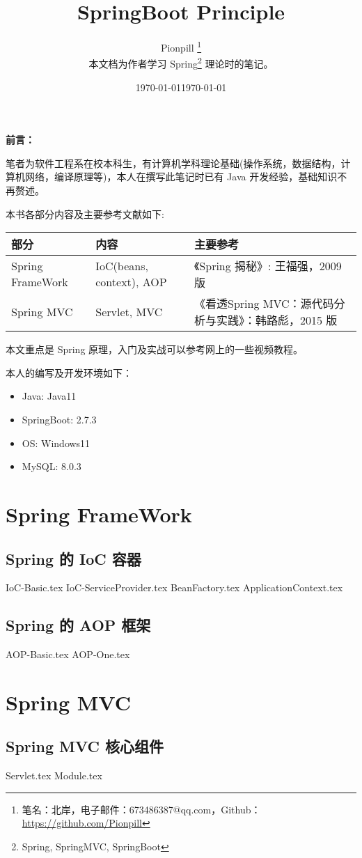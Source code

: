 \documentclass{PionpillNote-book}
\title{SpringBoot Principle}
\author{
    Pionpill \footnote{笔名：北岸，电子邮件：673486387@qq.com，Github：\url{https://github.com/Pionpill}} \\
    本文档为作者学习 Spring\footnote{Spring, SpringMVC, SpringBoot} 理论时的笔记。\\
}
\date{\today}
\begin{document}
\pagestyle{plain}
\maketitle

\noindent\textbf{前言：}

笔者为软件工程系在校本科生，有计算机学科理论基础(操作系统，数据结构，计算机网络，编译原理等)，本人在撰写此笔记时已有 Java 开发经验，基础知识不再赘述。

本书各部分内容及主要参考文献如下:
\begin{table}[H]
    \footnotesize
    \centering
    \setlength{\tabcolsep}{4mm}
    \begin{tabular}{l|l|l}
        \toprule
        \textbf{部分} & \textbf{内容} & \textbf{主要参考} \\
        \midrule
        Spring FrameWork & IoC(beans, context), AOP & 《Spring 揭秘》: 王福强，2009 版 \\
        Spring MVC & Servlet, MVC & 《看透Spring MVC：源代码分析与实践》：韩路彪，2015 版 \\
        \bottomrule
    \end{tabular}
\end{table}

本文重点是 Spring 原理，入门及实战可以参考网上的一些视频教程。

本人的编写及开发环境如下：
\begin{itemize}
    \item Java: Java11
    \item SpringBoot: 2.7.3
    \item OS: Windows11 
    \item MySQL: 8.0.3
\end{itemize}

\date{\today}
\newpage

\tableofcontents

\newpage

\setcounter{page}{1} 
\pagestyle{fancy}

\part{Spring FrameWork}
\chapter{Spring 的 IoC 容器}
{IoC-Basic.tex}
{IoC-ServiceProvider.tex}
{BeanFactory.tex}
{ApplicationContext.tex}
\chapter{Spring 的 AOP 框架}
{AOP-Basic.tex}
{AOP-One.tex}

\part{Spring MVC}
\chapter{Spring MVC 核心组件}
{Servlet.tex}
{Module.tex}
\end{document}
